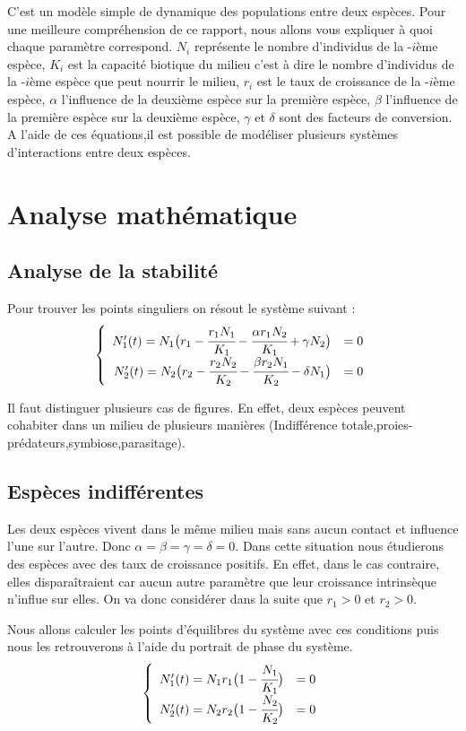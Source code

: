 \documentclass[11pt]{article}
\begin{document}
C'est un modèle simple de dynamique des populations entre deux espèces. Pour une meilleure compréhension de ce rapport, nous allons vous expliquer à quoi chaque paramètre correspond. 
$N_i$ représente le nombre d’individus de la -$i$ème espèce, $K_i$ est la capacité biotique du milieu c'est à dire le nombre d’individus de la -$i$ème espèce que peut nourrir le milieu, $r_i $ est le taux de
croissance  de la -$i$ème espèce, $\alpha$ l’influence de la deuxième espèce sur la première espèce, $\beta$ l’influence de la première
espèce sur la deuxième espèce, $\gamma$ et $\delta$ sont des facteurs de conversion.
A l'aide de ces équations,il est possible de modéliser plusieurs systèmes d'interactions entre deux espèces.
\section{Analyse mathématique}
\subsection{Analyse de la stabilité}
Pour trouver les points singuliers on résout le système suivant : 
\[
\left\{
\begin{array}{r c}

N_1'(t) = N_1 \big( r_1 - \cfrac{r_1N_1}{K_1} - \cfrac{\alpha r_1N_2}{K_1} + \gamma N_2\big) & = 0 \\
N_2'(t) = N_2 \big( r_2 - \cfrac{r_2N_2}{K_2} - \cfrac{\beta r_2N_1}{K_2} - \delta N_1\big) & = 0
\end{array}
\right.
\]


Il faut distinguer plusieurs cas de figures. En effet, deux espèces peuvent cohabiter dans un milieu de plusieurs manières (Indifférence totale,proies-prédateurs,symbiose,parasitage).
\subsection{Espèces indifférentes}

Les deux espèces vivent dans le même milieu mais sans aucun contact et influence l'une sur l'autre. Donc $\alpha=\beta=\gamma=\delta=0$. Dans cette situation nous étudierons des espèces avec des taux de croissance positifs. En effet, dans le cas contraire, elles disparaîtraient car aucun autre paramètre que leur croissance intrinsèque n'influe sur elles. On va donc considérer dans la suite que $r_1 > 0$ et $r_2 > 0$.

Nous allons calculer les points d'équilibres du système avec ces conditions puis nous les retrouverons à l'aide du portrait de phase du système.
\[
\left\{
\begin{array}{r c}

N_1'(t) = N_1r_1 \big( 1 - \cfrac{N_1}{K_1} \big) & = 0 \\
N_2'(t) = N_2r_2 \big( 1 - \cfrac{N_2}{K_2} \big)  & = 0
\end{array}
\right.
\]
\end{document}
